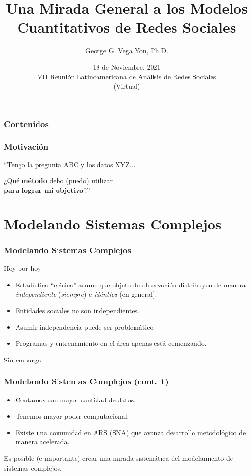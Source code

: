 \documentclass[aspectratio=169]{beamer}
\title[Modelos Cuant. de Redes Sociales]{Una Mirada General a los Modelos Cuantitativos de Redes Sociales}
\author[ggvy.cl]{George G. Vega Yon, Ph.D.}
\date{18 de Noviembre, 2021\\VII Reunión Latinoamericana de Análisis de Redes Sociales\\(Virtual)}
\institute[UofU Epi]{University of Utah\\Division of Epidemiology}
\begin{document}

\begin{frame}
	\frametitle{Contenidos}
\tableofcontents
\end{frame}

\begin{frame}
	\frametitle{Motivación}
	``Tengo la pregunta ABC y los datos XYZ...\pause \bigskip
	\hfill\begin{minipage}{.8\linewidth}
		\raggedleft
		\Large ¿Qué \textbf{método} debo (puedo) utilizar\\\textbf{para lograr mi objetivo}?''
	\end{minipage}
\end{frame}

\section{Modelando Sistemas Complejos}


\begin{frame}
	\frametitle{Modelando Sistemas Complejos}
	Hoy por hoy
	\pause
	\begin{itemize}
		\item Estadística ``clásica'' asume que objeto de observación distribuyen de manera \textit{independiente} (\textit{siempre}) e \textit{idéntica}\pause{} (en general).\pause
		\item Entidades sociales no son independientes.\pause
		\item Asumir independencia puede ser problemático.\pause
		\item Programas y entrenamiento en el área apenas está comenzando.
	\end{itemize}\pause
	\vfill\hfill Sin embargo...
	\end{frame}

\begin{frame}
	\frametitle{Modelando Sistemas Complejos (cont. 1)}
	\begin{itemize}
		\item Contamos con mayor cantidad de datos.\pause
		\item Tenemos mayor poder computacional.\pause
		\item Existe una comunidad en ARS (SNA) que avanza desarrollo metodológico de manera acelerada.\pause
\end{itemize}

\vfill\hfill\large Es posible (e importante) crear una mirada sistemática del modelamiento de sistemas complejos.

\end{frame}
\end{document}
